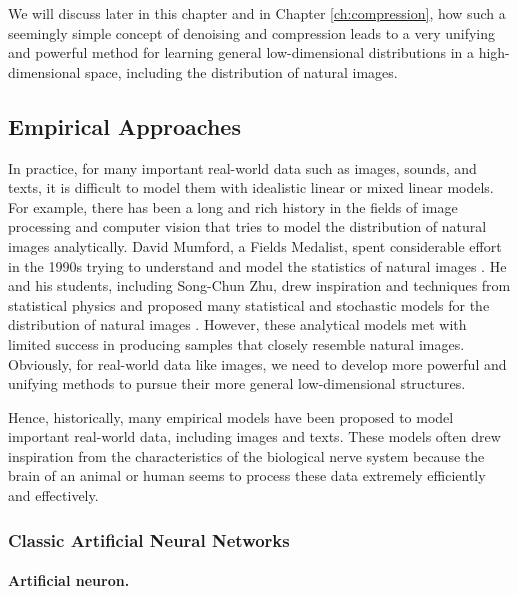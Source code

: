 \documentclass[../../book-main.tex]{subfiles}
\begin{document}
We will discuss later in this chapter and in Chapter \ref{ch:compression}, how such a seemingly simple concept of denoising and compression leads to a very unifying and powerful method for learning general low-dimensional distributions in a high-dimensional space, including the distribution of natural images. 

\subsection{Empirical Approaches}
In practice, for many important real-world data such as images, sounds, and texts, it is difficult to model them with idealistic linear or mixed linear models. For example, there has been a long and rich history in the fields of image processing and computer vision that tries to model the distribution of natural images analytically. David Mumford, a Fields Medalist, spent considerable effort in the 1990s trying to understand and model the statistics of natural images \cite{Mumford1996TheSD}. He and his students, including Song-Chun Zhu, drew inspiration and techniques from statistical physics and proposed many statistical and stochastic models for the distribution of natural images \cite{Zhu-Entropy-1997,Zhu1997LearningGP,Zhu1997Prior,Huang-Mumford,Mumford-1999,Lee-Mumford}. However, these analytical models met with limited success in producing samples that closely resemble natural images. Obviously, for real-world data like images, we need to develop more powerful and unifying methods to pursue their more general low-dimensional structures.

Hence, historically, many empirical models  have been proposed to model important real-world data, including images and texts. These models often drew inspiration from the characteristics of the biological nerve system because the brain of an animal or human seems to process these data extremely efficiently and effectively. 

\subsubsection{Classic Artificial Neural Networks}
\paragraph{Artificial neuron.}
\end{document}
